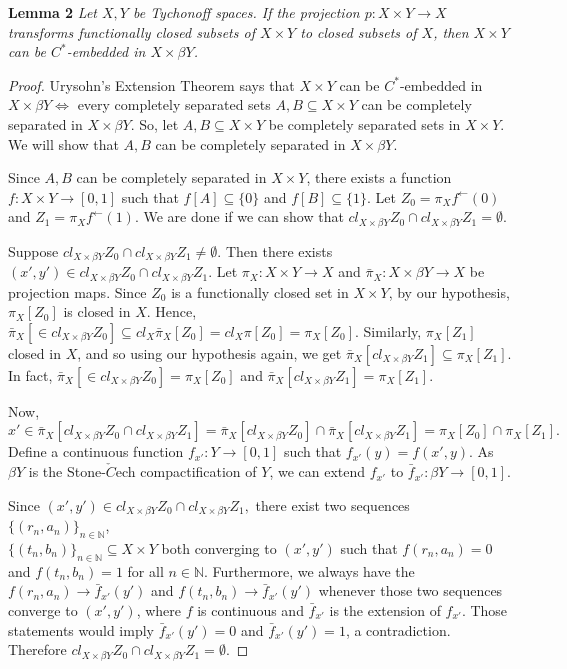 \documentclass{amsart}
\author{shaun yi cheng}
\begin{document}
\textbf{Lemma 2}
\emph{Let $X, Y$ be Tychonoff spaces. If the projection $p: X\times Y \rightarrow X$ transforms functionally closed subsets of $X\times Y$ to closed subsets of $X$, then $X\times Y$ can be $C^*$-embedded in $X\times \beta Y$.}


\begin{proof}Urysohn's Extension Theorem says that $X\times Y$ can be $C^*$-embedded in $X\times \beta Y \iff $ every completely separated sets $A,B \subseteq X\times Y$ can be completely separated in $X\times \beta Y.$ So, let $A, B \subseteq X\times Y$ be completely separated sets in $X\times Y$. We will show that $A,B$ can be completely separated in $X\times \beta Y.$

Since $A, B$ can be completely separated in $X\times Y$, there exists a function $f: X\times Y \rightarrow [0,1]$ such that $f[A]\subseteq \{0\} $ and $f[B]\subseteq \{1\}$. Let $Z_0=\pi_X f^\leftarrow (0)$ and $Z_1= \pi_X f^\leftarrow (1)$. We are done if we can show that $cl_{X\times \beta Y} Z_0 \cap cl_{X\times \beta Y}Z_1 = \emptyset.$



Suppose $cl_{X\times \beta Y} Z_0 \cap cl_{X\times \beta Y}Z_1 \neq \emptyset.$ Then there exists $(x',y') \in cl_{X\times \beta Y} Z_0 \cap cl_{X\times \beta Y}Z_1.$ Let $\pi_X: X\times Y \rightarrow X$ and $\bar{\pi}_X:X\times \beta Y \rightarrow X$ be projection maps. Since $Z_0$ is a functionally closed set in $X \times Y$, by our hypothesis, $\pi_X[Z_0]$ is closed in $X$. Hence, $\bar{\pi}_X[\in cl_{X\times \beta Y} Z_0] \subseteq cl_X \bar{\pi}_X[Z_0] = cl_X \pi[Z_0] = \pi_X[Z_0].$ Similarly, $\pi_X [Z_1]$ closed in $X$, and so using our hypothesis again, we get $\bar{\pi}_X[ cl_{X\times \beta Y} Z_1] \subseteq  \pi_X[Z_1]$. In fact, $\bar{\pi}_X[\in cl_{X\times \beta Y} Z_0]= \pi_X[Z_0]$ and $\bar{\pi}_X[ cl_{X\times \beta Y} Z_1] =  \pi_X[Z_1]$. 

Now, $x' \in \bar{\pi}_X[ cl_{X\times \beta Y} Z_0 \cap cl_{X\times \beta Y}Z_1]=\bar{\pi}_X[ cl_{X\times \beta Y} Z_0]  \cap \bar{\pi}_X[cl_{X\times \beta Y}Z_1] = \pi_X[Z_0] \cap \pi_X[Z_1].$ Define a continuous function $f_{x'}:Y\rightarrow [0,1]$ such that $f_{x'}(y)=f(x',y).$ As $\beta Y$ is the Stone-$\check{C}$ech compactification of $Y$, we can extend $f_{x'}$ to $\bar{f}_{x'}:\beta Y \rightarrow [0,1]$.

Since $(x',y') \in cl_{X\times \beta Y} Z_0 \cap cl_{X\times \beta Y}Z_1,$ there exist two sequences $\{(r_n,a_n)\}_{n\in\mathbb{N}}$, \\$ \{(t_n,b_n)\}_{n\in\mathbb{N}} \subseteq X\times Y$ both converging to $(x',y')$ such that $f(r_n,a_n)=0$ and $f(t_n,b_n)=1$ for all $n\in \mathbb{N}$. 
Furthermore, we always have the $f(r_n,a_n)\rightarrow \bar{f}_{x'}(y')$ and $f(t_n,b_n)\rightarrow \bar{f}_{x'}(y')$ whenever those two sequences converge to $(x',y')$, where $f$ is continuous and $\bar{f}_{x'}$ is the extension of $f_{x'}$. Those statements would imply $\bar{f}_{x'}(y')=0$ and $\bar{f}_{x'}(y')=1$, a contradiction. Therefore $cl_{X\times \beta Y} Z_0 \cap cl_{X\times \beta Y}Z_1 = \emptyset.$





\end{proof}
\end{document}
